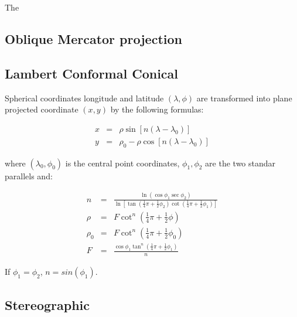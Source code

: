 The 

\subsection{Oblique Mercator projection}

\subsection{Lambert Conformal Conical}

Spherical coordinates longitude and latitude $(\lambda, \phi)$ are transformed
into plane projected coordinate $(x,y)$ by the following formulas:

\begin{eqnarray}
x &=& \rho \sin \left[ n (\lambda-\lambda_0) \right] \\
y &=& \rho_0 - \rho \cos \left[ n (\lambda-\lambda_0) \right] 
\end{eqnarray}

where $(\lambda_0, \phi_0)$ is the central point coordinates, $\phi_1,\phi_2$
are the two standar parallels and:

\begin{eqnarray}
  n &=& \frac{\ln\left(\cos \phi_1 \sec \phi_2\right)}
        {\ln \left[ \tan \left( \frac{1}{4} \pi + \frac{1}{2}\phi_2 \right)
        \cot \left(\frac{1}{4}\pi + \frac{1}{2}\phi_1 \right) \right]} \\
  \rho &=& F \cot^n \left( \frac{1}{4}\pi + \frac{1}{2}\phi \right) \\
  \rho_0 &=& F \cot^n \left( \frac{1}{4}\pi + \frac{1}{2}\phi_0 \right) \\ 
  F &=& \frac{\cos \phi_1 \tan^n \left( \frac{1}{4}\pi +
              \frac{1}{2}\phi_1 \right) }{n}
\end{eqnarray}

If $\phi_1 = \phi_2$, $n = sin(\phi_1)$.
 
\subsection{Stereographic}



